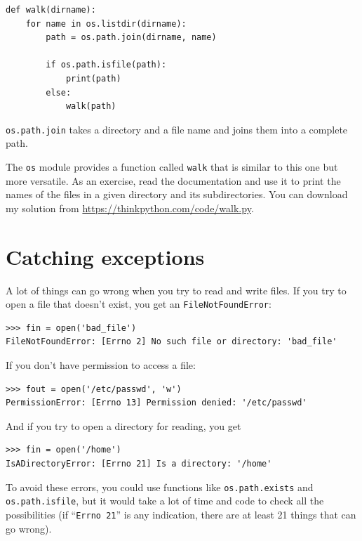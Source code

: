 \documentclass[10pt]{book}
\begin{document}
\begin{verbatim}
def walk(dirname):
    for name in os.listdir(dirname):
        path = os.path.join(dirname, name)

        if os.path.isfile(path):
            print(path)
        else:
            walk(path)
\end{verbatim}
%
{\tt os.path.join} takes a directory and a file name and joins
them into a complete path.

The {\tt os} module provides a function called {\tt walk} that is
similar to this one but more versatile.  As an exercise, read the
documentation and use it to print the names of the files in a given
directory and its subdirectories.  You can download my solution from
\url{https://thinkpython.com/code/walk.py}.


\section{Catching exceptions}
\label{catch}

A lot of things can go wrong when you try to read and write
files.  If you try to open a file that doesn't exist, you get an
{\tt FileNotFoundError}:

\begin{verbatim}
>>> fin = open('bad_file')
FileNotFoundError: [Errno 2] No such file or directory: 'bad_file'

\end{verbatim}
%
If you don't have permission to access a file:

\begin{verbatim}
>>> fout = open('/etc/passwd', 'w')
PermissionError: [Errno 13] Permission denied: '/etc/passwd'
\end{verbatim}
%
And if you try to open a directory for reading, you get

\begin{verbatim}
>>> fin = open('/home')
IsADirectoryError: [Errno 21] Is a directory: '/home'
\end{verbatim}
%
To avoid these errors, you could use functions like {\tt os.path.exists}
and {\tt os.path.isfile}, but it would take a lot of time and code
to check all the possibilities (if ``{\tt Errno 21}'' is any
indication, there are at least 21 things that can go wrong).
\end{document}
